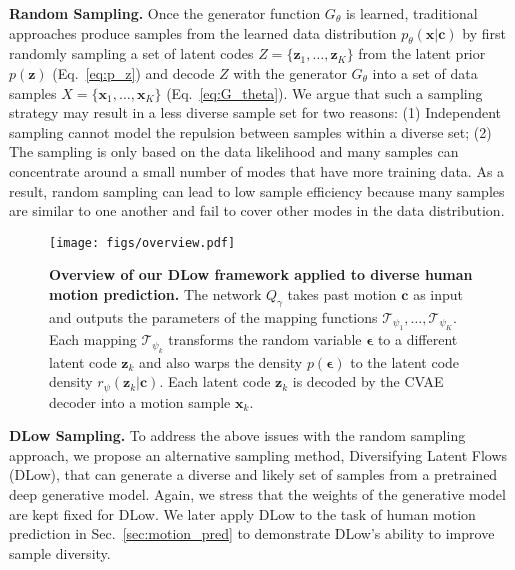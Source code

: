 \documentclass[runningheads]{llncs}
\begin{document}
	\vspace{2mm}
	\noindent\textbf{Random Sampling.} 
	Once the generator function $G_\theta$ is learned, traditional approaches produce samples from the learned data distribution $p_\theta(\mathbf{x}|\mathbf{c})$ by first randomly sampling a set of latent codes $Z = \{\mathbf{z}_1, \ldots, \mathbf{z}_K\}$ from the latent prior $p(\mathbf{z})$ (Eq.~\eqref{eq:p_z}) and decode $Z$ with the generator $G_\theta$ into a set of data samples $X = \{\mathbf{x}_1, \ldots, \mathbf{x}_K\}$ (Eq.~\eqref{eq:G_theta}). We argue that such a sampling strategy may result in a less diverse sample set for two reasons: (1) Independent sampling cannot model the repulsion between samples within a diverse set; (2) The sampling is only based on the data likelihood and many samples can concentrate around a small number of modes that have more training data. As a result, random sampling can lead to low sample efficiency because many samples are similar to one another and fail to cover other modes in the data distribution.
	
	\begin{figure*}[t]
		\centering
		\texttt{[image: figs/overview.pdf]}
		\vspace{-7mm}
		\caption{\textbf{Overview of our DLow framework applied to diverse human motion prediction.} The network $Q_\gamma$ takes past motion $\mathbf{c}$ as input and outputs the parameters of the mapping functions $\mathcal{T}_{\psi_1}, \ldots, \mathcal{T}_{\psi_K}$. Each mapping $\mathcal{T}_{\psi_k}$ transforms the random variable $\boldsymbol{\epsilon}$ to a different latent code $\mathbf{z}_k$ and also warps the density $p(\boldsymbol{\epsilon})$ to the latent code density $r_\psi(\mathbf{z}_k|\mathbf{c})$. Each latent code $\mathbf{z}_k$ is decoded by the CVAE decoder into a motion sample $\mathbf{x}_k$.}
		\label{fig:overview}
		\vspace{-5mm}
	\end{figure*}
	
	\vspace{2mm}
	\noindent\textbf{DLow Sampling.} To address the above issues with the random sampling approach, we propose an alternative sampling method, Diversifying Latent Flows (DLow), that can generate a diverse and likely set of samples from a pretrained deep generative model. Again, we stress that the weights of the generative model are kept fixed for DLow. We later apply DLow to the task of human motion prediction in Sec.~\ref{sec:motion_pred} to demonstrate DLow's ability to improve sample diversity.
	
\end{document}
